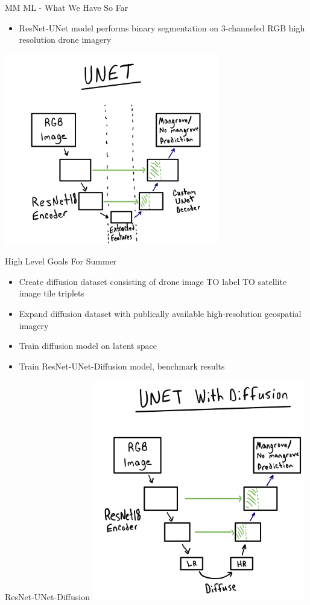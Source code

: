 \begin{frame}{MM ML - What We Have So Far}
    \begin{itemize}
        \item ResNet-UNet model performs binary segmentation on 3-channeled RGB high resolution drone imagery
    \end{itemize}
    \includegraphics[height=0.7\textheight,width=0.7\textwidth,keepaspectratio]{images/unet.png}
\end{frame}

\begin{frame}{High Level Goals For Summer}
  \begin{itemize}
      \item Create diffusion dataset consisting of drone image TO label TO satellite image tile triplets
      \item Expand diffusion dataset with publically available high-resolution geospatial imagery
      \item Train diffusion model on latent space
      \item Train ResNet-UNet-Diffusion model, benchmark results
  \end{itemize}
\end{frame}

\begin{frame}{ResNet-UNet-Diffusion}
    \centering
    \includegraphics[height=0.7\textheight,width=0.7\textwidth,keepaspectratio]{images/unet-diffusion.png}
\end{frame}

